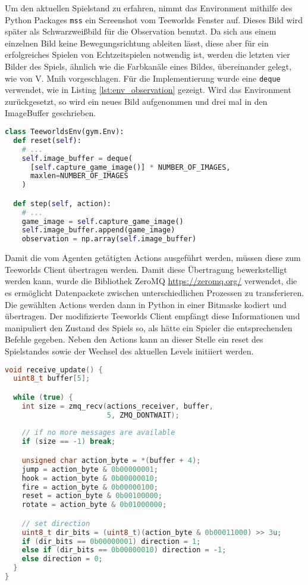 \documentclass[11pt]{scrartcl}
\begin{document}
Um den aktuellen Spielstand zu erfahren, nimmt das Environment mithilfe des Python
Packages \lstinline!mss! ein Screenshot vom Teeworlds Fenster auf. Dieses Bild wird
später als Schwarzweißbild für die Observation benutzt. Da sich aus einem einzelnen Bild
keine Bewegungsrichtung ableiten lässt, diese aber für ein erfolgreiches Spielen von
Echtzeitspielen notwendig ist, werden die letzten vier Bilder des Spiels, ähnlich wie die
Farbkanäle eines Bildes, übereinander gelegt, wie von V. Mnih \cite[~S.5]{mnih2013playing}
vorgeschlagen. Für die Implementierung wurde eine \lstinline!deque! verwendet, wie in
Listing \ref{lst:env_observation} gezeigt. Wird das Environment zurückgesetzt, so wird
ein neues Bild aufgenommen und drei mal in den ImageBuffer geschrieben.
\begin{lstlisting}[language=Python, caption=Observation des Environments,
label=lst:env_observation]
class TeeworldsEnv(gym.Env):
  def reset(self):
    # ...
    self.image_buffer = deque(
      [self.capture_game_image()] * NUMBER_OF_IMAGES,
      maxlen=NUMBER_OF_IMAGES
    )

  def step(self, action):
    # ...
    game_image = self.capture_game_image()
    self.image_buffer.append(game_image)
    observation = np.array(self.image_buffer)
\end{lstlisting}
Damit die vom Agenten getätigten Actions ausgeführt werden, müssen diese zum Teeworlds Client
übertragen werden. Damit diese Übertragung bewerkstelligt werden kann, wurde die Bibliothek
ZeroMQ \url{https://zeromq.org/} verwendet, die es ermöglicht Datenpackete zwischen
unterschiedlichen Prozessen zu transferieren. Die gewählten Actions werden dann in Python
in einer Bitmaske kodiert und übertragen. Der modifizierte Teeworlds Client empfängt diese
Informationen und manipuliert den Zustand des Spiels so, als hätte ein Spieler die
entsprechenden Befehle gegeben. Neben den Actions kann an dieser Stelle ein reset des
Spielstandes sowie der Wechsel des aktuellen Levels initiiert werden.
\begin{lstlisting}[language=C++, caption=Empfangen der Actions im Teeworlds Client,
label=lst:teeclient_receive]
void receive_update() {
  uint8_t buffer[5];

  while (true) {
    int size = zmq_recv(actions_receiver, buffer,
                        5, ZMQ_DONTWAIT);
                        
    // if no more messages are available
    if (size == -1) break; 

    unsigned char action_byte = *(buffer + 4);
    jump = action_byte & 0b00000001;
    hook = action_byte & 0b00000010;
    fire = action_byte & 0b00000100;
    reset = action_byte & 0b00100000;
    rotate = action_byte & 0b01000000;

    // set direction
    uint8_t dir_bits = (uint8_t)(action_byte & 0b00011000) >> 3u;
    if (dir_bits == 0b00000001) direction = 1;
    else if (dir_bits == 0b00000010) direction = -1;
    else direction = 0;
  }
}
\end{lstlisting}
\end{document}
